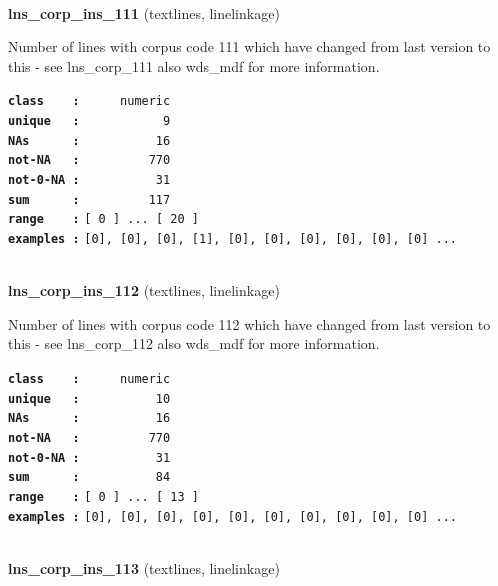 \documentclass[]{article}
\begin{document}
~

\textbf{lns\_corp\_ins\_111} (textlines, linelinkage)

Number of lines with corpus code 111 which have changed from last
version to this - see lns\_corp\_111 also wds\_mdf for more information.

\textbf{\texttt{class\ \ \ \ :}} \texttt{~~~~~numeric}\\
\textbf{\texttt{unique\ \ \ :}} \texttt{~~~~~~~~~~~9}\\
\textbf{\texttt{NAs\ \ \ \ \ \ :}} \texttt{~~~~~~~~~~16}\\
\textbf{\texttt{not-NA\ \ \ :}} \texttt{~~~~~~~~~770}\\
\textbf{\texttt{not-0-NA\ :}} \texttt{~~~~~~~~~~31}\\
\textbf{\texttt{sum\ \ \ \ \ \ :}} \texttt{~~~~~~~~~117}\\
\textbf{\texttt{range\ \ \ \ :}}
\texttt{{[}\ 0\ {]}\ ...\ {[}\ 20\ {]}}\\
\textbf{\texttt{examples\ :}}
\texttt{{[}0{]},\ {[}0{]},\ {[}0{]},\ {[}1{]},\ {[}0{]},\ {[}0{]},\ {[}0{]},\ {[}0{]},\ {[}0{]},\ {[}0{]}\ ...}\\

~

\textbf{lns\_corp\_ins\_112} (textlines, linelinkage)

Number of lines with corpus code 112 which have changed from last
version to this - see lns\_corp\_112 also wds\_mdf for more information.

\textbf{\texttt{class\ \ \ \ :}} \texttt{~~~~~numeric}\\
\textbf{\texttt{unique\ \ \ :}} \texttt{~~~~~~~~~~10}\\
\textbf{\texttt{NAs\ \ \ \ \ \ :}} \texttt{~~~~~~~~~~16}\\
\textbf{\texttt{not-NA\ \ \ :}} \texttt{~~~~~~~~~770}\\
\textbf{\texttt{not-0-NA\ :}} \texttt{~~~~~~~~~~31}\\
\textbf{\texttt{sum\ \ \ \ \ \ :}} \texttt{~~~~~~~~~~84}\\
\textbf{\texttt{range\ \ \ \ :}}
\texttt{{[}\ 0\ {]}\ ...\ {[}\ 13\ {]}}\\
\textbf{\texttt{examples\ :}}
\texttt{{[}0{]},\ {[}0{]},\ {[}0{]},\ {[}0{]},\ {[}0{]},\ {[}0{]},\ {[}0{]},\ {[}0{]},\ {[}0{]},\ {[}0{]}\ ...}\\

~

\textbf{lns\_corp\_ins\_113} (textlines, linelinkage)
\end{document}
